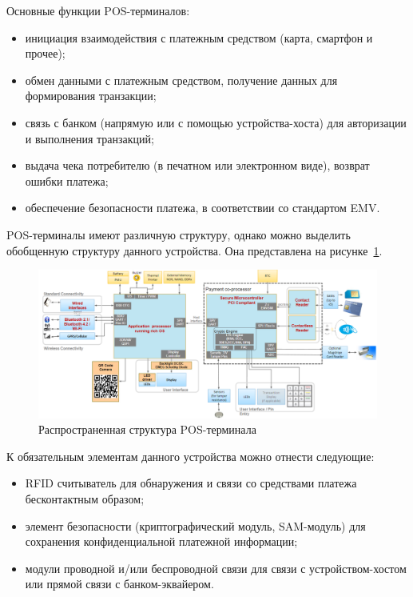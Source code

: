 Основные функции POS-терминалов:

\begin{itemize}
    \item инициация взаимодействия с платежным средством (карта, смартфон и прочее);
    \item обмен данными с платежным средством, получение данных для формирования транзакции;
    \item связь с банком (напрямую или с помощью устройства-хоста) для авторизации и выполнения транзакций;
    \item выдача чека потребителю (в печатном или электронном виде), возврат ошибки платежа;
    \item обеспечение безопасности платежа, в соответствии со стандартом EMV.
\end{itemize}

POS-терминалы имеют различную структуру, однако можно выделить обобщенную структуру данного устройства.
Она представлена на рисунке~\ref{fig:postrem_struct}.

\begin{figure}[H]
    \centering
    \includegraphics[width=1\textwidth]{images/research/postrem_struct}
    \caption{\centering Распространенная структура POS-терминала}
    \label{fig:postrem_struct}
\end{figure}

К обязательным элементам данного устройства можно отнести следующие:

\begin{itemize}
    \item RFID считыватель для обнаружения и связи со средствами платежа бесконтактным образом;
    \item элемент безопасности (криптографический модуль, SAM-модуль) для сохранения конфиденциальной платежной информации;
    \item модули проводной и/или беспроводной связи для связи с устройством-хостом или прямой связи с банком-эквайером.
\end{itemize}

